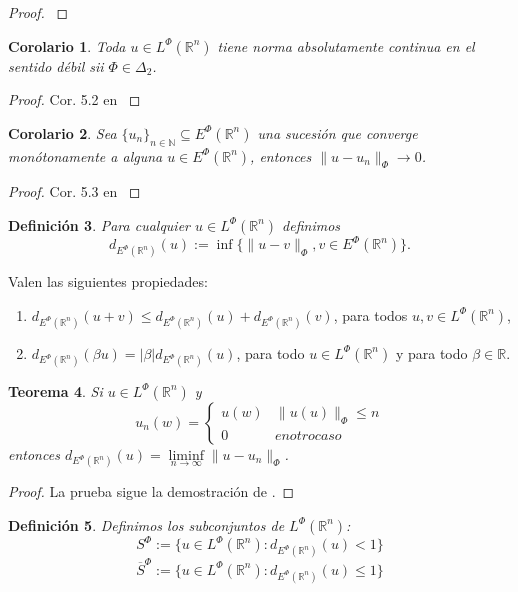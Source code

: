 \documentclass[a4paper,11pt]{amsart}
\theoremstyle{plain}
\newtheorem{thm}{Teorema}[section]
\newtheorem{cor}[thm]{Corolario }
\newtheorem{defi}[thm]{Definici\'on}
\theoremstyle{remark}
\theoremstyle{remark}
\newcommand{\rr}{\mathbb{R}}
\newcommand{\nn}{\mathbb{N}}
\numberwithin{equation}{section}
\begin{document}
\begin{proof}
\cite[p.373]{Schap2005}
\end{proof}

\begin{cor}
Toda $u \in L^{\Phi}(\rr^n)$ tiene norma absolutamente continua en el sentido d\'ebil sii $\Phi \in \Delta_2$.
\end{cor}

\begin{proof}
Cor. 5.2 en \cite[p. 373]{Schap2005}
\end{proof}

\begin{cor}
Sea $\{u_n\}_{n \in \nn} \subseteq E^{\Phi}(\rr^n)$ una sucesi\'on  que converge mon\'otonamente a alguna $u \in E^{\Phi}(\rr^n)$, entonces
$\|u-u_n\|_{\Phi}\to 0$. 
\end{cor}

\begin{proof}
Cor. 5.3 en \cite[p.373]{Schap2005}
\end{proof}

\begin{defi}
Para cualquier $u \in L^{\Phi}(\rr^n)$ definimos
\[
d_{E^{\Phi}(\rr^n)}(u):=\inf\{ \| u-v\|_{\Phi}, v \in E^{\Phi}(\rr^n)\}.
\]
\end{defi}

Valen las siguientes propiedades:
\begin{enumerate}
\item $d_{E^{\Phi}(\rr^n)}(u+v)\leq d_{E^{\Phi}(\rr^n)}(u)+d_{E^{\Phi}(\rr^n)}(v)$, para todos $u,v \in L^{\Phi}(\rr^n)$,
\item $d_{E^{\Phi}(\rr^n)}(\beta u)=|\beta| d_{E^{\Phi}(\rr^n)}(u)$, para todo $u \in L^{\Phi}(\rr^n)$ y para todo $\beta \in \rr$.
\end{enumerate}


\begin{thm}
Si $u \in L^{\Phi}(\rr^n)$ y 
\[
u_n(w)=\left\{\begin{array}{ll}
u(w)&\|u(u)\|_{\Phi}\leq n
\\
0&en otro caso
\end{array}
\right.
\]
entonces $d_{E^{\Phi}(\rr^n)}(u)=\liminf \limits_{n \to \infty} \|u-u_n\|_{\Phi}$.
\end{thm}

\begin{proof}
La prueba sigue la demostraci\'on de \cite[Prop. 3, pp. 92-92]{RR91}.
\end{proof}


\begin{defi}
Definimos los subconjuntos de $L^{\Phi}(\rr^n)$:
\[
S^{\Phi}:=\{ u \in L^{\Phi}(\rr^n): d_{E^{\Phi}(\rr^n)}(u)<1\}
\]
\[
\overline{S}^{\Phi}:=\{ u \in L^{\Phi}(\rr^n): d_{E^{\Phi}(\rr^n)}(u)\leq 1\}
\]

\end{defi}
\end{document}
